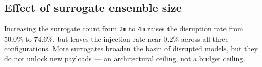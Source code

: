 \subsection{Effect of surrogate ensemble size}

Increasing the surrogate count from \texttt{2m} to \texttt{4m} raises the disruption rate from $50.0\%$ to $74.6\%$, but leaves the injection rate near $0.2\%$ across all three configurations. More surrogates broaden the basin of disrupted models, but they do not unlock new payloads --- an architectural ceiling, not a budget ceiling.
